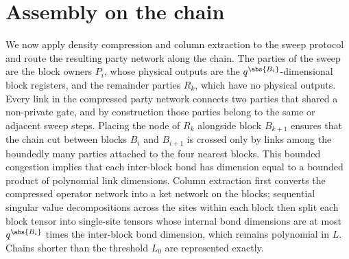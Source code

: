 \section{Assembly on the chain}\label{sec:routing}

\begin{inwords}
We now apply density compression and column extraction to the sweep protocol
and route the resulting party network along the chain. The parties of the
sweep are the block owners $P_i$, whose physical outputs are the
$q^{\abs{B_i}}$-dimensional block registers, and the remainder parties $R_k$,
which have no physical outputs. Every link in the compressed party network
connects two parties that shared a non-private gate, and by construction
those parties belong to the same or adjacent sweep steps. Placing the node of
$R_k$ alongside block $B_{k+1}$ ensures that the chain cut between blocks
$B_i$ and $B_{i+1}$ is crossed only by links among the boundedly many parties
attached to the four nearest blocks. This bounded congestion implies that each
inter-block bond has dimension equal to a bounded product of polynomial link
dimensions. Column extraction first converts the compressed operator network
into a ket network on the blocks; sequential singular value decompositions
across the sites within each block then split each block tensor into
single-site tensors whose internal bond dimensions are at most
$q^{\abs{B_i}}$ times the inter-block bond dimension, which remains
polynomial in $L$. Chains shorter than the threshold $L_0$ are represented
exactly.
\end{inwords}

